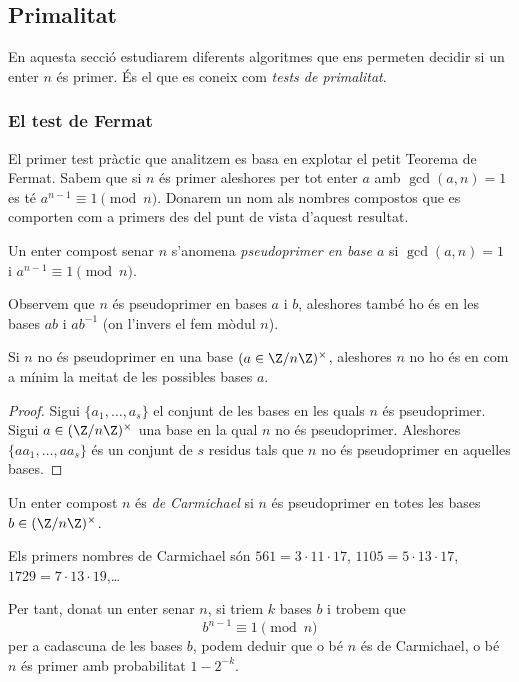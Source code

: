 
\subsection{Primalitat}

En aquesta secció estudiarem diferents algoritmes que ens permeten decidir si un enter $n$ és primer. És el que es coneix com \emph{tests de primalitat}.

 \subsubsection{El test de Fermat}
 El primer test pràctic que analitzem es basa en explotar el petit Teorema de Fermat. Sabem que si $n$ és primer aleshores per tot enter $a$ amb $\gcd(a,n)=1$ es té $a^{n-1}\equiv 1\pmod n$. Donarem un nom als nombres compostos que es comporten com a primers des del punt de vista d'aquest resultat.
 \begin{definition}
 Un enter compost senar $n$ s'anomena \emph{pseudoprimer en base $a$} si $\gcd(a,n)=1$ i $a^{n-1}\equiv 1\pmod n$.
 \end{definition}
 
 Observem que $n$ és pseudoprimer en bases $a$ i $b$, aleshores també ho és en les bases $ab$ i $ab^{-1}$ (on l'invers el fem mòdul $n$).
 
 \begin{lemma}
 Si $n$ no és pseudoprimer en una base $(a\in\Z/n\Z)^\times$, aleshores $n$ no ho és en com a mínim la meitat de les possibles bases $a$.
 \end{lemma}
 \begin{proof}
  Sigui $\{a_1,\ldots,a_s\}$ el conjunt de les bases en les quals $n$ és pseudoprimer. Sigui $a\in(\Z/n\Z)^\times$ una base en la qual $n$ no és pseudoprimer. Aleshores $\{aa_1,\ldots,aa_s\}$ és un conjunt de $s$ residus tals que $n$ no és pseudoprimer en aquelles bases.
 \end{proof}
 
 \begin{definition}
 Un enter compost $n$ és \emph{de Carmichael} si $n$ és pseudoprimer en totes les bases $b\in(\Z/n\Z)^\times$.
 \end{definition}
 
 Els primers nombres de Carmichael són $561=3\cdot 11\cdot 17$, $1105=5\cdot 13\cdot 17$, $1729 = 7\cdot 13\cdot 19$,\ldots
 
 Per tant, donat un enter senar $n$, si triem $k$ bases $b$ i trobem que
 \[
 b^{n-1}\equiv 1\pmod n
 \]
 per a cadascuna de les bases $b$, podem deduir que o bé $n$ és de Carmichael, o bé $n$ és primer amb probabilitat $1-2^{-k}$.
 
